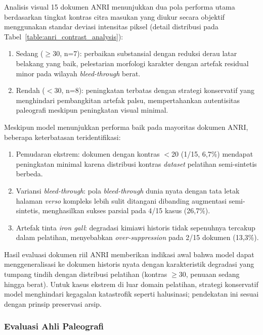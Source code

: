 \documentclass[12pt,a4paper]{article}
\begin{document}
Analisis visual 15 dokumen ANRI menunjukkan dua pola performa utama berdasarkan tingkat kontras citra masukan yang diukur secara objektif menggunakan standar deviasi intensitas piksel (detail distribusi pada Tabel~\ref{table:anri_contrast_analysis}):
\begin{enumerate}[leftmargin=1.5em, labelsep=0.5em, itemindent=0pt, noitemsep, topsep=0pt]
  \item Sedang ($\geq$30, n=7): perbaikan substansial dengan reduksi derau latar belakang yang baik, pelestarian morfologi karakter dengan artefak residual minor pada wilayah \textit{bleed-through} berat.
  \item Rendah ($<$30, n=8): peningkatan terbatas dengan strategi konservatif yang menghindari pembangkitan artefak palsu, mempertahankan autentisitas paleografi meskipun peningkatan visual minimal.
\end{enumerate}


Meskipun model menunjukkan performa baik pada mayoritas dokumen ANRI, beberapa keterbatasan teridentifikasi:
\begin{enumerate}[leftmargin=1.5em, labelsep=0.5em, itemindent=0pt, noitemsep, topsep=0pt]
  \item Pemudaran ekstrem: dokumen dengan kontras $<$20 (1/15, 6,7\%) mendapat peningkatan minimal karena distribusi kontras \textit{dataset} pelatihan semi-sintetis berbeda.
  \item Variansi \textit{bleed-through}: pola \textit{bleed-through} dunia nyata dengan tata letak halaman \textit{verso} kompleks lebih sulit ditangani dibanding augmentasi semi-sintetis, menghasilkan sukses parsial pada 4/15 kasus (26,7\%).
  \item Artefak tinta \textit{iron gall}: degradasi kimiawi historis tidak sepenuhnya tercakup dalam pelatihan, menyebabkan \textit{over-suppression} pada 2/15 dokumen (13,3\%).
\end{enumerate}

Hasil evaluasi dokumen riil ANRI memberikan indikasi awal bahwa model dapat menggeneralisasi ke dokumen historis nyata dengan karakteristik degradasi yang tumpang tindih dengan distribusi pelatihan (kontras $\geq$30, penuaan sedang hingga berat). Untuk kasus ekstrem di luar domain pelatihan, strategi konservatif model menghindari kegagalan katastrofik seperti halusinasi; pendekatan ini sesuai dengan prinsip preservasi arsip.



\subsubsection{Evaluasi Ahli Paleografi}
\label{subsubsec:anri-validasi-ahli}
\end{document}
